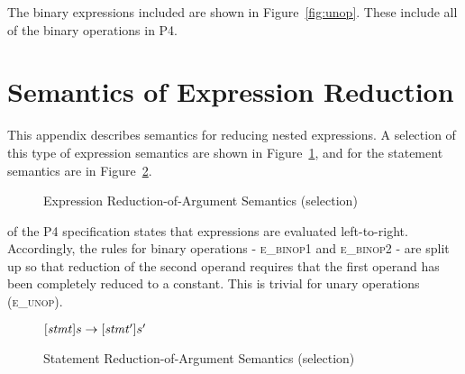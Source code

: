 \documentclass[UTF8]{article}
\begin{document}
The binary expressions included are shown in Figure~\ref{fig:unop}. These include all of the binary operations in P4.

\section{Semantics of Expression Reduction}
\label{app:exp}
This appendix describes semantics for reducing nested expressions. A selection of this type of expression semantics are shown in Figure~\ref{fig:semexp2}, and for the statement semantics are in Figure~\ref{fig:semstmt2}.

\begin{figure}[ht!]
\caption{Expression Reduction-of-Argument Semantics (selection)}
\label{fig:semexp2}
\end{figure}

 of the P4 specification states that expressions are evaluated left-to-right. Accordingly, the rules for binary operations - \textsc{e\_binop1} and \textsc{e\_binop2} - are split up so that reduction of the second operand requires that the first operand has been completely reduced to a constant. This is trivial for unary operations (\textsc{e\_unop}).

\begin{figure}[ht!]
\begin{ottdefnblock}{$[  \mathit{stmt}  ]  s  \rightarrow  [  \mathit{stmt'}  ]  s'$}{}
\ottusedrule{\ottdrulestmtXXretXXe{}}
\ottusedrule{\ottdrulestmtXXassXXe{}}
\ottusedrule{\ottdrulestmtXXcondXXe{}}
\ottusedrule{\ottdrulestmtXXverifyXXeOne{}}
\ottusedrule{\ottdrulestmtXXverifyXXeTwo{}}
\end{ottdefnblock}
\caption{Statement Reduction-of-Argument Semantics (selection)}
\label{fig:semstmt2}
\end{figure}

\printbibliography
\end{document}
